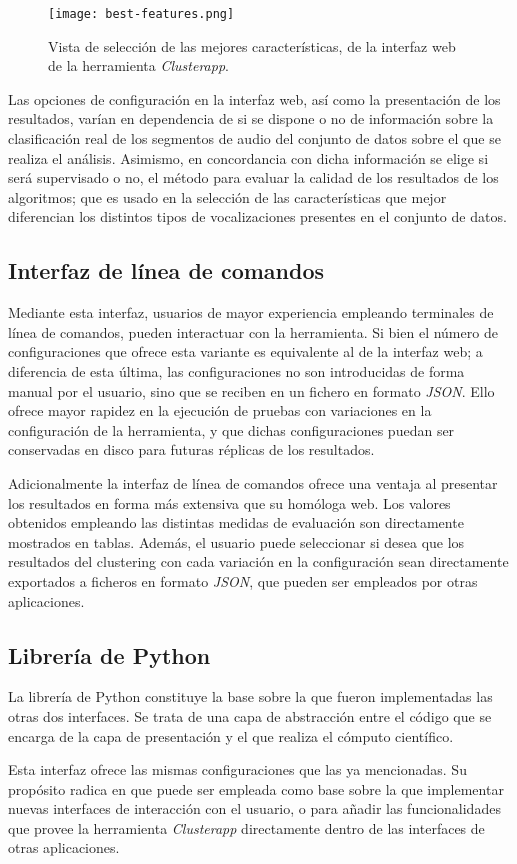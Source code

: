 \begin{figure}[!h]
    \centering
    \texttt{[image: best-features.png]}
    \caption{Vista de selección de las mejores características, de la interfaz web de la herramienta \textit{Clusterapp}.}
    \label{img:best-features}
\end{figure}

Las opciones de configuración en la interfaz web, así como la presentación de los resultados, varían en dependencia de si se dispone o no de información sobre la clasificación real de los segmentos de audio del conjunto de datos sobre el que se realiza el análisis.
Asimismo, en concordancia con dicha información se elige si será supervisado o no, el método para evaluar la calidad de los resultados de los algoritmos;
que es usado en la selección de las características que mejor diferencian los distintos tipos de vocalizaciones presentes en el conjunto de datos.

\subsection{Interfaz de línea de comandos}\label{subsec:CLI}

Mediante esta interfaz, usuarios de mayor experiencia empleando terminales de línea de comandos, pueden interactuar con la herramienta.
Si bien el número de configuraciones que ofrece esta variante es equivalente al de la interfaz web;
a diferencia de esta última, las configuraciones no son introducidas de forma manual por el usuario, sino que se reciben en un fichero en formato \textit{JSON}.
Ello ofrece mayor rapidez en la ejecución de pruebas con variaciones en la configuración de la herramienta, y que dichas configuraciones puedan ser conservadas en disco para futuras réplicas de los resultados.

Adicionalmente la interfaz de línea de comandos ofrece una ventaja al presentar los resultados en forma más extensiva que su homóloga web.
Los valores obtenidos empleando las distintas medidas de evaluación son directamente mostrados en tablas.
Además, el usuario puede seleccionar si desea que los resultados del clustering con cada variación en la configuración sean directamente exportados a ficheros en formato \textit{JSON}, que pueden ser empleados por otras aplicaciones.

\subsection{Librería de Python}\label{subsec:libreríaDePython}

La librería de Python constituye la base sobre la que fueron implementadas las otras dos interfaces.
Se trata de una capa de abstracción entre el código que se encarga de la capa de presentación y el que realiza el cómputo científico.

Esta interfaz ofrece las mismas configuraciones que las ya mencionadas.
Su propósito radica en que puede ser empleada como base sobre la que implementar nuevas interfaces de interacción con el usuario, o para añadir las funcionalidades que provee la herramienta \textit{Clusterapp} directamente dentro de las interfaces de otras aplicaciones.